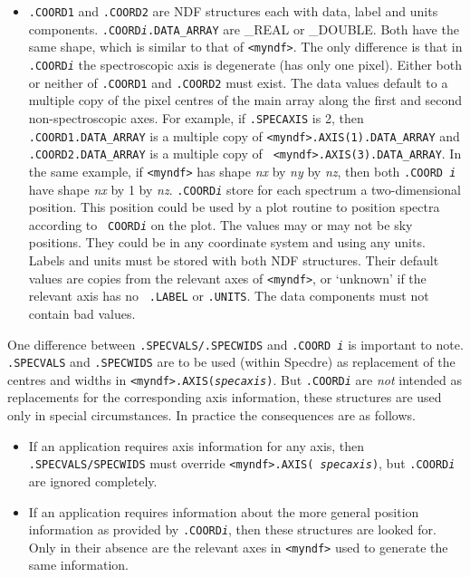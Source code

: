 \begin{itemize}

\item{\tt .COORD1} and {\tt .COORD2} are NDF structures each with data,
   label and units components. {\tt .COORD{\it i}.DATA\_ARRAY} are \_REAL
   or \_DOUBLE. Both have the same shape, which is similar to that of
   {\tt <myndf>}. The only difference is that in {\tt .COORD{\it i}} the
   spectroscopic axis is degenerate (has only one pixel).  Either both
   or neither of {\tt .COORD1} and {\tt .COORD2} must exist.
   The data values default to a multiple copy of the pixel centres of
   the main array along the first and second non-spectroscopic axes. For
   example, if {\tt .SPECAXIS} is 2, then {\tt .COORD1.DATA\_ARRAY} is a
   multiple copy of {\tt <myndf>.AXIS(1).DATA\_ARRAY} and {\tt
   .COORD2.DATA\_ARRAY} is a multiple copy of {\tt
   <myndf>.AXIS(3).DATA\_ARRAY}. In the same example, if {\tt <myndf>}
   has shape {\it nx} by {\it ny} by {\it nz}, then both {\tt .COORD{\it
   i}} have shape {\it nx} by 1 by {\it nz}. {\tt .COORD{\it i}} store
   for each spectrum a two-dimensional position. This position could be
   used by a plot routine to position spectra according to {\tt
   COORD{\it i}} on the plot. The values may or may not be sky
   positions. They could be in any coordinate system and using any
   units. Labels and units must be stored with both NDF
   structures. Their default values are copies from the relevant axes of
   {\tt <myndf>}, or `unknown' if the relevant axis has no {\tt
   .LABEL} or {\tt .UNITS}. The data components must not contain bad
   values.

\end{itemize}

   One difference between {\tt .SPECVALS/.SPECWIDS} and {\tt .COORD{\it
   i}} is important to note. {\tt .SPECVALS} and {\tt .SPECWIDS} are to
   be used (within Specdre) as replacement of the centres and widths in
   {\tt <myndf>.AXIS({\it specaxis})}. But {\tt .COORD{\it i}} are {\em
   not\/} intended as replacements for the corresponding axis
   information, these structures are used only in special circumstances.
   In practice the consequences are as follows.

\begin{itemize}

\item If an application requires axis information for any axis, then
   {\tt .SPECVALS/SPECWIDS} must override {\tt <myndf>.AXIS({\it
   specaxis})}, but {\tt .COORD{\it i}} are ignored completely.

\item If an application requires information about the more general
   position information as provided by {\tt .COORD{\it i}}, then these
   structures are looked for. Only in their absence are the relevant
   axes in {\tt <myndf>} used to generate the same information.

\end{itemize}


